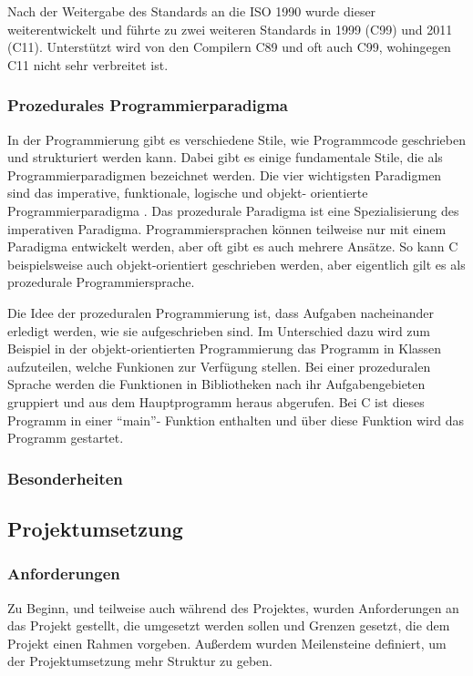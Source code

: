   Nach der Weitergabe des Standards an die \ac{ISO} 1990 wurde dieser weiterentwickelt und
  führte zu zwei weiteren Standards in 1999 (C99) und 2011 (C11). Unterstützt wird von den
  Compilern C89 und oft auch C99, wohingegen C11 nicht sehr verbreitet ist. \nocite{ritchie93}
 
 \subsubsection{Prozedurales Programmierparadigma}
  In der Programmierung gibt es verschiedene Stile, wie Programmcode geschrieben und strukturiert
  werden kann. Dabei gibt es einige fundamentale Stile, die als Programmierparadigmen bezeichnet
  werden. Die vier wichtigsten Paradigmen sind das imperative, funktionale, logische und objekt-
  orientierte Programmierparadigma \cite{normark03}. Das prozedurale Paradigma ist eine Spezialisierung des 
  imperativen Paradigma. Programmiersprachen können teilweise nur mit einem Paradigma entwickelt
  werden, aber oft gibt es auch mehrere Ansätze. So kann C beispielsweise auch objekt-orientiert
  geschrieben werden, aber eigentlich gilt es als prozedurale Programmiersprache.
  
  Die Idee der prozeduralen Programmierung ist, dass Aufgaben nacheinander erledigt werden, wie
  sie aufgeschrieben sind. Im Unterschied dazu wird zum Beispiel in der objekt-orientierten
  Programmierung das Programm in Klassen aufzuteilen, welche Funkionen zur Verfügung stellen. Bei
  einer prozeduralen Sprache werden die Funktionen in Bibliotheken nach ihr Aufgabengebieten
  gruppiert und aus dem Hauptprogramm heraus abgerufen. Bei C ist dieses Programm in einer ``main''-
  Funktion enthalten und über diese Funktion wird das Programm gestartet.

 \subsubsection{Besonderheiten}
 

\subsection{Projektumsetzung}
 \subsubsection{Anforderungen}
 Zu Beginn, und teilweise auch während des Projektes, wurden Anforderungen
 an das Projekt gestellt, die umgesetzt werden sollen und Grenzen gesetzt, die
 dem Projekt einen Rahmen vorgeben. Außerdem wurden Meilensteine definiert,
 um der Projektumsetzung mehr Struktur zu geben.
 
